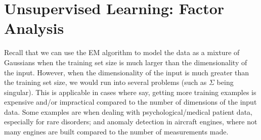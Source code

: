 \documentclass[letterpaper,10pt]{article}
\begin{document}
%
%
%
%



\section{Unsupervised Learning: Factor Analysis}

Recall that we can use the EM algorithm to model the data as a mixture of Gaussians when the training set size is much larger than the dimensionality of the input. However, when the dimensionality of the input is much greater than the training set size, we would run into several problems (such as $\Sigma$ being singular). This is applicable in cases where say, getting more training examples is expensive and/or impractical compared to the number of dimensions of the input data. Some examples are when dealing with psychological/medical patient data, especially for rare disorders; and anomaly detection in aircraft engines, where not many engines are built compared to the number of measurements made.
\end{document}
